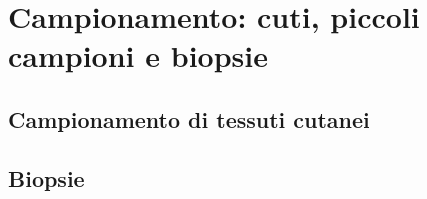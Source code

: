 \chapter{Campionamento: cuti, piccoli campioni e biopsie}

\section{Campionamento di tessuti cutanei}

\section{Biopsie}
